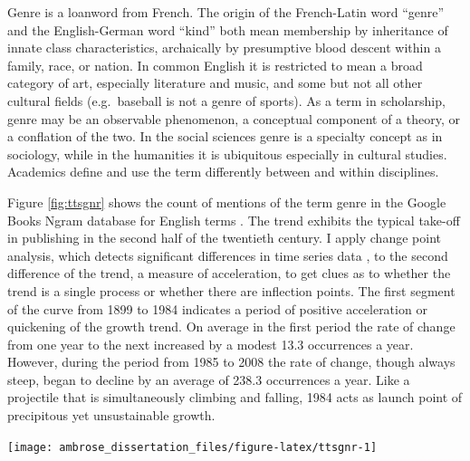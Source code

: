 \documentclass[]{book}
\theoremstyle{definition}
\theoremstyle{definition}
\theoremstyle{definition}
\theoremstyle{remark}
\begin{document}
Genre is a loanword from French. The origin of the French-Latin word
``genre'' and the English-German word ``kind'' both mean membership by
inheritance of innate class characteristics, archaically by presumptive
blood descent within a family, race, or nation. In common English it is
restricted to mean a broad category of art, especially literature and
music, and some but not all other cultural fields (e.g.~baseball is not
a genre of sports). As a term in scholarship, genre may be an observable
phenomenon, a conceptual component of a theory, or a conflation of the
two. In the social sciences genre is a specialty concept as in
sociology, while in the humanities it is ubiquitous especially in
cultural studies. Academics define and use the term differently between
and within disciplines.

Figure \ref{fig:ttsgnr} shows the count of mentions of the term genre in
the Google Books Ngram database for English terms
\citep{Michel2011Quantitative}. The trend exhibits the typical take-off
in publishing in the second half of the twentieth century. I apply
change point analysis, which detects significant differences in time
series data \citep{Matteson2013Nonparametric, James2019ecp}, to the
second difference of the trend, a measure of acceleration, to get clues
as to whether the trend is a single process or whether there are
inflection points. The first segment of the curve from 1899 to 1984
indicates a period of positive acceleration or quickening of the growth
trend. On average in the first period the rate of change from one year
to the next increased by a modest 13.3 occurrences a year. However,
during the period from 1985 to 2008 the rate of change, though always
steep, began to decline by an average of 238.3 occurrences a year. Like
a projectile that is simultaneously climbing and falling, 1984 acts as
launch point of precipitous yet unsustainable growth.

\begin{center}\texttt{[image: ambrose\_dissertation\_files/figure-latex/ttsgnr-1]} \end{center}
\end{document}
